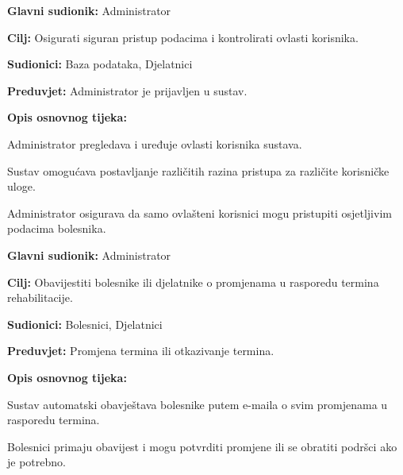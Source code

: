 \documentclass{article}
\begin{document}
\vspace{1em} %
\begin{packed_item}
\item \textbf{Glavni sudionik:} Administrator
\item \textbf{Cilj:} Osigurati siguran pristup podacima i kontrolirati ovlasti korisnika.
\item \textbf{Sudionici:} Baza podataka, Djelatnici
\item \textbf{Preduvjet:} Administrator je prijavljen u sustav.
\item \textbf{Opis osnovnog tijeka:}
\begin{packed_enum}
\item Administrator pregledava i uređuje ovlasti korisnika sustava.
\item Sustav omogućava postavljanje različitih razina pristupa za različite korisničke uloge.
\item Administrator osigurava da samo ovlašteni korisnici mogu pristupiti osjetljivim podacima bolesnika.
\end{packed_enum}
\end{packed_item}

\vspace{1em} %
\begin{packed_item}
\item \textbf{Glavni sudionik:} Administrator
\item \textbf{Cilj:} Obavijestiti bolesnike ili djelatnike o promjenama u rasporedu termina rehabilitacije.
\item \textbf{Sudionici:} Bolesnici, Djelatnici
\item \textbf{Preduvjet:} Promjena termina ili otkazivanje termina.
\item \textbf{Opis osnovnog tijeka:}
\begin{packed_enum}
\item Sustav automatski obavještava bolesnike putem e-maila o svim promjenama u rasporedu termina.
\item Bolesnici primaju obavijest i mogu potvrditi promjene ili se obratiti podršci ako je potrebno.
\end{packed_enum}
\end{packed_item}
\end{document}
